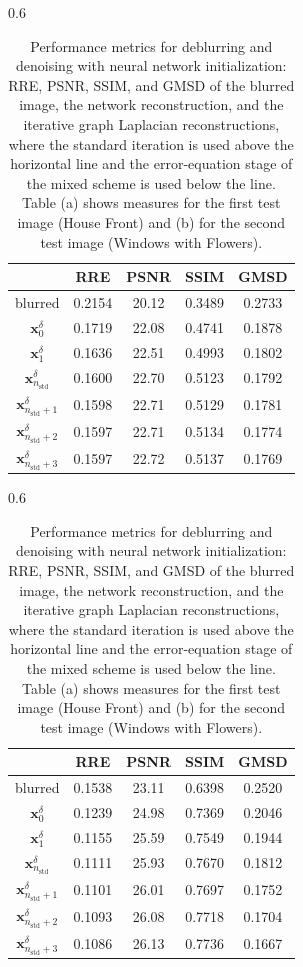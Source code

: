 \documentclass{article}
\theoremstyle{remark}
\newcommand{\bx}{{\bm{x}}}
\begin{document}
\begin{table}
\centering
   \begin{subtable}{0.6\textwidth}
   \begin{tabular}{c|c|c|c|c}
         & RRE & PSNR & SSIM & GMSD \\ \hline
        blurred  & 0.2154 & 20.12 & 0.3489 & 0.2733 \\ 
		  $\bx_{0}^{\delta}$ & 0.1719 & 22.08 & 0.4741 & 0.1878 \\
        $\bx_{1}^{\delta}$ & 0.1636 & 22.51 & 0.4993 & 0.1802 \\
		$\bx_{n_{\mathrm{std}}}^{\delta}$  & 0.1600 & 22.70 & 0.5123 & 0.1792 \\ \hline
		  $\bx_{n_{\mathrm{std}}+1}^{\delta}$ & 0.1598 & 22.71 & 0.5129 & 0.1781\\
        $\bx_{n_{\mathrm{std}}+2}^{\delta}$ & 0.1597 & 22.71 & 0.5134 & 0.1774 \\
        $\bx_{n_{\mathrm{std}}+3}^{\delta}$ & 0.1597 & 22.72 & 0.5137 & 0.1769 \\
	\end{tabular}
    \caption{}
    \end{subtable}
    \begin{subtable}{0.6\textwidth}
    \begin{tabular}{c|c|c|c|c}
         & RRE & PSNR & SSIM & GMSD \\ \hline
        blurred  & 0.1538 & 23.11 & 0.6398 & 0.2520 \\ 
		  $\bx_{0}^{\delta}$ & 0.1239 & 24.98 & 0.7369 & 0.2046 \\
        $\bx_{1}^{\delta}$ & 0.1155 & 25.59 & 0.7549 & 0.1944 \\
		$\bx_{n_{\mathrm{std}}}^{\delta}$  & 0.1111 & 25.93 & 0.7670 & 0.1812  \\ \hline
		$\bx_{n_{\mathrm{std}}+1}^{\delta}$ & 0.1101 & 26.01 & 0.7697 & 0.1752 \\
        $\bx_{n_{\mathrm{std}}+2}^{\delta}$ & 0.1093 & 26.08 & 0.7718 & 0.1704 \\
        $\bx_{n_{\mathrm{std}}+3}^{\delta}$ & 0.1086 & 26.13 & 0.7736 & 0.1667 \\
	\end{tabular}
    \caption{}
    \end{subtable}
	
	\caption{Performance metrics for deblurring and denoising with neural network initialization: RRE, PSNR, SSIM, and GMSD of the blurred image, the network reconstruction, and the iterative graph Laplacian reconstructions, where the standard iteration is used above the horizontal line and the error-equation stage of the mixed scheme is used below the line. Table (a) shows measures for the first test image (House Front) and (b) for the second test image (Windows with Flowers).}
    \label{Table:network_test}
\end{table}
\end{document}
